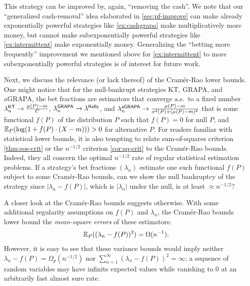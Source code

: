 This strategy can be improved by, again, ``removing the cash''. We note that
our ``generalized cash-removal'' idea elaborated in \eqref{sec:pf-improve} can make already exponentially powerful strategies like \cref{ex:cashgrapa} make multiplicatively more money, but cannot make subexponentially powerful strategies like \cref{ex:intermittent} make exponentially money. Generalizing the ``betting more frequently'' improvement we mentioned above for \cref{ex:intermittent} to more subexponentially powerful strategies is of interest for future work.



Next, we discuss the relevance (or lack thereof) of the Cram\'er-Rao lower bounds.
One might notice that for the null-bankrupt strategies
KT, GRAPA, and aGRAPA, the bet fractions are estimators that converge a.s.\ to a fixed number $\lambda^{\mathsf{KT}}_n \to \frac{\mu(P) - m}{C}$, $\lambda^{\mathsf{GRAPA}}_n \to \lambda^{\mathsf{Kelly}}$, and $\lambda^{\mathsf{aGRAPA}}_n \to \frac{\mu(P) - m}{\sigma^2(P) + (\mu(P)-m)^2}$ that is some functional $f(P)$ of the distribution $P$ such that $f(P) = 0$ for null $P$, and $\mathbb E_P( \log (1+f(P)\cdot (X-m)) ) > 0 $ for alternative $P$. For readers familiar with statistical lower bounds, it is also tempting to relate sum-of-squares criterion \cref{thm:sos-crit} or the $n^{-1/2}$ criterion \cref{cor:sq-crit} to the Cram\'er-Rao bounds. Indeed, they all concern the optimal $n^{-1/2}$ rate of regular statistical estimation problems. If a strategy's bet fractions $(\lambda_n)$ estimate one such functional $f(P)$ subject to some Cram\'er-Rao bounds, can we show the null bankruptcy of the strategy since $|\lambda_n - f(P)|$, which is $|\lambda_n |$ under the null, is at least $\approx n^{-1/2}$?

A closer look at the Cram\'er-Rao bounds suggests otherwise.  With some additional regularity assumptions on $f(P)$ and $\lambda_n$, the Cram\'er-Rao bounds lower bound the \emph{mean-square errors} of these estimators:
\begin{equation}
    \mathbb E_P(  (\lambda_n - f(P))^2 )  = \Omega(n^{-1}).
\end{equation}
However, it is easy to see that these variance bounds would imply neither $\lambda_n - f(P) = \Omega_{p}(n^{-1/2})$ nor $ \sum_{n=1}^\infty (\lambda_n - f(P))^2 = \infty$; a sequence of random variables may have infinite expected values while vanishing to 0 at an arbitrarily fast almost sure rate.


